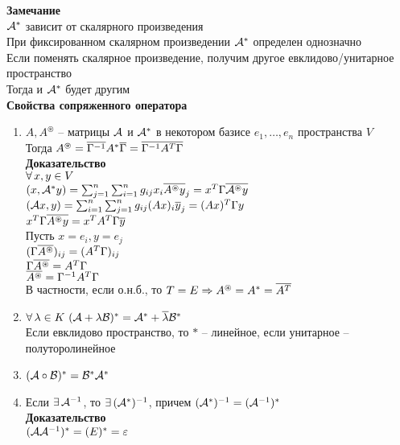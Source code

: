 \documentclass[12pt]{article}
\begin{document}
\textbf{Замечание}\\
$\mathcal{A}^*$ зависит от скалярного произведения\\
При фиксированном скалярном произведении $\mathcal{A}^*$ определен однозначно\\
Если поменять скалярное произведение, получим другое евклидово/унитарное пространство\\
Тогда и $\mathcal{A}^*$ будет другим\\
\textbf{Свойства сопряженного оператора}
\begin{enumerate}
    \item $A, A^{\circledast}$ -- матрицы $\mathcal{A}$ и $\mathcal{A}^*$ в некотором базисе $e_1, \ldots, e_n$ пространства $V$\\
        Тогда $A^{\circledast} = \overline {\Gamma^{-1}} A^* \overline \Gamma = \overline{\Gamma^{-1} A^T \Gamma}$\\
        \textbf{Доказательство}\\
        $\forall\, x, y \in V$\\
        $(x, \mathcal{A}^* y) = \sum_{j=1}^n \sum_{i=1}^n g_{ij} x_i \overline{A^{\circledast} y}_j = x^T \Gamma \overline{\mathcal{A}^{\circledast} y}$\\
        $(\mathcal{A} x, y) = \sum_{i=1}^n \sum_{j=1}^n g_{ij} (A x)_i \overline{y}_j = (A x)^T \Gamma y $\\
        $x^T \Gamma  \overline{A^{\circledast} y} = x^T A^T \Gamma \overline y $\\
        Пусть $x = e_i, y = e_j$\\
        $( \Gamma \overline{A^{\circledast}})_{ij} = (A^T \Gamma)_{ij} $\\
        $ \Gamma \overline{A^{\circledast}} = A^T \Gamma $\\
        $ \overline{A^{\circledast}} = \Gamma^{-1}A^T \Gamma $\\
        В частности, если о.н.б., то $T = E \Rightarrow A^{\circledast} = A^* = \overline{A^T} $
    \item $\forall\, \lambda \in K\ (\mathcal{A} + \lambda\mathcal{B})^* = \mathcal{A}^* + \overline \lambda \mathcal{B}^* $\\
        Если евклидово пространство, то $*$ -- линейное, если унитарное -- полуторолинейное
    \item $(\mathcal{A} \circ \mathcal{B})^* = \mathcal{B}^* \mathcal{A}^*$
    \item Если $\exists\, \mathcal{A}^{-1}$, то $\exists\, (\mathcal{A}^*)^{-1}$, причем $(\mathcal{A}^*)^{-1} = (\mathcal{A}^{-1})^* $\\
        \textbf{Доказательство}\\
        $(\mathcal{A} \mathcal{A}^{-1})^* = (E)^* = \varepsilon $\\

\end{enumerate}
\end{document}
